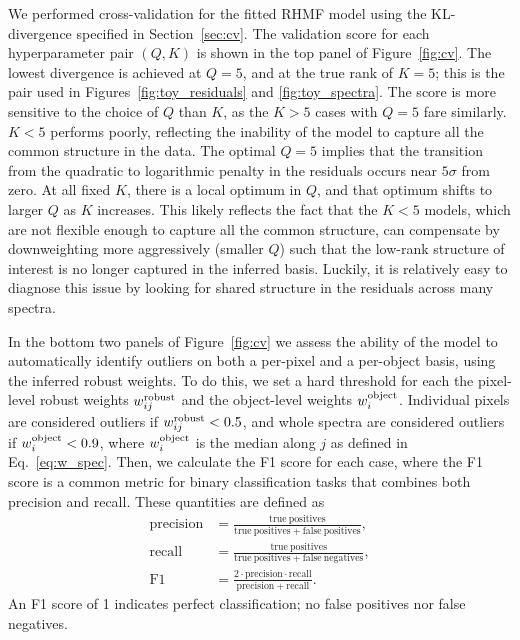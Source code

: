 \documentclass[onecolumn,floatfix,linenumbers,trackchanges]{aastex631}
\begin{document}
We performed cross-validation for the fitted RHMF model using the KL-divergence specified in Section~\ref{sec:cv}.
The validation score for each hyperparameter pair $(Q, K)$ is shown in the top panel of Figure~\ref{fig:cv}.
The lowest divergence is achieved at $Q=5$, and at the true rank of $K=5$; this is the pair used in Figures~\ref{fig:toy_residuals} and \ref{fig:toy_spectra}. The score is more sensitive to the choice of $Q$ than $K$, as the $K>5$ cases with $Q=5$ fare similarly.
$K<5$ performs poorly, reflecting the inability of the model to capture all the common structure in the data.
The optimal $Q=5$ implies that the transition from the quadratic to logarithmic penalty in the residuals occurs near $5\sigma$ from zero. 
At all fixed $K$, there is a local optimum in $Q$, and that optimum shifts to larger $Q$ as $K$ increases.
This likely reflects the fact that the $K<5$ models, which are not flexible enough to capture all the common structure, can compensate by downweighting more aggressively (smaller $Q$) such that the low-rank structure of interest is no longer captured in the inferred basis.
Luckily, it is relatively easy to diagnose this issue by looking for shared structure in the residuals across many spectra.

In the bottom two panels of Figure~\ref{fig:cv} we assess the ability of the model to automatically identify outliers on both a per-pixel and a per-object basis, using the inferred robust weights.
To do this, we set a hard threshold for each the pixel-level robust weights $w_{ij}^{\rm robust}$ and the object-level weights $w_i^{\rm object}$.
Individual pixels are considered outliers if $w_{ij}^{\rm robust} < 0.5$, and whole spectra are considered outliers if $w_i^{\rm object} < 0.9$, where $w_i^{\rm object}$ is the median along $j$ as defined in Eq.~\eqref{eq:w_spec}.
Then, we calculate the F1 score for each case, where the F1 score is a common metric for binary classification tasks that combines both precision and recall.
These quantities are defined as
\begin{align}
    \mathrm{precision} &= \frac{\mathrm{true~positives}}{\mathrm{true~positives} + \mathrm{false~positives}}, \\
    \mathrm{recall} &= \frac{\mathrm{true~positives}}{\mathrm{true~positives} + \mathrm{false~negatives}}, \\
    \mathrm{F1} &= \frac{2 \cdot \mathrm{precision} \cdot \mathrm{recall}}{\mathrm{precision} + \mathrm{recall}}.
\end{align}
An F1 score of 1 indicates perfect classification; no false positives nor false negatives.
\end{document}

